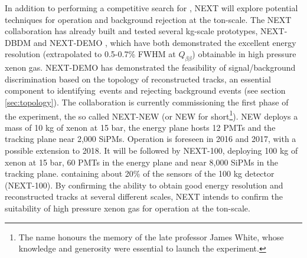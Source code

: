 \documentclass[a4paper,11pt]{article}
\begin{document}
In addition to performing a competitive search for \bbonu, NEXT will explore potential 
techniques for operation and background rejection at the ton-scale.  The NEXT collaboration has already built and tested several kg-scale prototypes, NEXT-DBDM \cite{Alvarez:2012kua} and
NEXT-DEMO \cite{Alvarez:2012xda,Alvarez:2012kua,Alvarez:2013gxa,Lorca:2014sra}, which have both demonstrated the excellent energy resolution (extrapolated to 0.5-0.7\% FWHM at
$Q_{\beta\beta}$) obtainable in high pressure xenon gas.  NEXT-DEMO has demonstrated the feasibility of signal/background discrimination based on the topology of reconstructed tracks,
an essential component to identifying \bbonu\,events and rejecting background events (see section \ref{sec:topology}).  The collaboration is currently commissioning the first phase of the experiment, the so called NEXT-NEW (or NEW for short\footnote{The name honours the memory of the late professor James White, whose knowledge and generosity were essential to launch the experiment.}). NEW deploys a  mass of 10 kg of xenon at 15 bar, the energy plane hosts 12 PMTs and the tracking plane near 2,000 SiPMs. Operation is foreseen in 2016 and 2017, with a possible extension to 2018. It will be followed by NEXT-100, deploying 100 kg of xenon at 15 bar, 60 PMTs in the energy plane and near 8,000 SiPMs in the tracking plane. 
containing about 20\% of the sensors of the 100 kg detector (NEXT-100).  By confirming the ability to obtain good energy resolution and reconstructed tracks at several different scales, NEXT 
intends to confirm the suitability of high pressure xenon gas for operation at the ton-scale.
\end{document}
